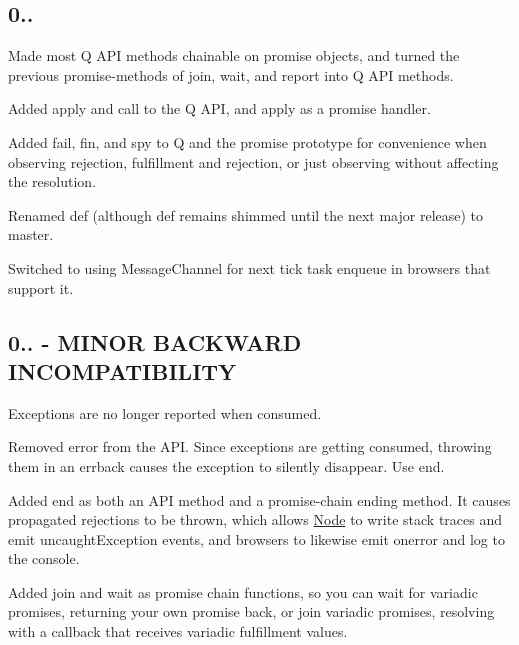 \subsection*{0..}


\begin{DoxyItemize}
\item Made most Q A\+PI methods chainable on promise objects, and turned the previous promise-\/methods of {\ttfamily join}, {\ttfamily wait}, and {\ttfamily report} into Q A\+PI methods.
\item Added {\ttfamily apply} and {\ttfamily call} to the Q A\+PI, and {\ttfamily apply} as a promise handler.
\item Added {\ttfamily fail}, {\ttfamily fin}, and {\ttfamily spy} to Q and the promise prototype for convenience when observing rejection, fulfillment and rejection, or just observing without affecting the resolution.
\item Renamed {\ttfamily def} (although {\ttfamily def} remains shimmed until the next major release) to {\ttfamily master}.
\item Switched to using {\ttfamily Message\+Channel} for next tick task enqueue in browsers that support it.
\end{DoxyItemize}

\subsection*{0.. -\/ M\+I\+N\+OR B\+A\+C\+K\+W\+A\+RD I\+N\+C\+O\+M\+P\+A\+T\+I\+B\+I\+L\+I\+TY}


\begin{DoxyItemize}
\item Exceptions are no longer reported when consumed.
\item Removed {\ttfamily error} from the A\+PI. Since exceptions are getting consumed, throwing them in an errback causes the exception to silently disappear. Use {\ttfamily end}.
\item Added {\ttfamily end} as both an A\+PI method and a promise-\/chain ending method. It causes propagated rejections to be thrown, which allows \mbox{\hyperlink{classNode}{Node}} to write stack traces and emit {\ttfamily uncaught\+Exception} events, and browsers to likewise emit {\ttfamily onerror} and log to the console.
\item Added {\ttfamily join} and {\ttfamily wait} as promise chain functions, so you can wait for variadic promises, returning your own promise back, or join variadic promises, resolving with a callback that receives variadic fulfillment values.
\end{DoxyItemize}

